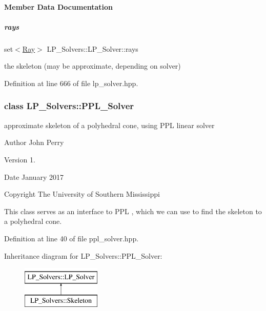 \paragraph{Member Data Documentation}
\mbox{\label{group___c_l_s_solvers_ad4c9fb3708c156496c23515c8e841374}} 
\subparagraph{\texorpdfstring{rays}{rays}}
{\footnotesize\ttfamily set$<$\hyperlink{group___c_l_s_solvers_class_l_p___solvers_1_1_ray}{Ray}$>$ L\+P\+\_\+\+Solvers\+::\+L\+P\+\_\+\+Solver\+::rays\hspace{0.3cm}{\ttfamily [protected]}}

the skeleton (may be approximate, depending on solver) 

Definition at line 666 of file lp\+\_\+solver.\+hpp.

\label{class_l_p___solvers_1_1_p_p_l___solver}
\subsubsection{class L\+P\+\_\+\+Solvers\+:\+:P\+P\+L\+\_\+\+Solver}
approximate skeleton of a polyhedral cone, using P\+PL linear solver 

\begin{DoxyAuthor}{Author}
John Perry 
\end{DoxyAuthor}
\begin{DoxyVersion}{Version}
1. 
\end{DoxyVersion}
\begin{DoxyDate}{Date}
January 2017 
\end{DoxyDate}
\begin{DoxyCopyright}{Copyright}
The University of Southern Mississippi
\end{DoxyCopyright}
This class serves as an interface to P\+PL \cite{BagnaraHZ08SCP}, which we can use to find the skeleton to a polyhedral cone. 

Definition at line 40 of file ppl\+\_\+solver.\+hpp.

Inheritance diagram for L\+P\+\_\+\+Solvers\+:\+:P\+P\+L\+\_\+\+Solver\+:\begin{figure}[H]
\begin{center}
\leavevmode
\includegraphics[height=2.000000cm]{group___c_l_s_solvers}
\end{center}
\end{figure}
